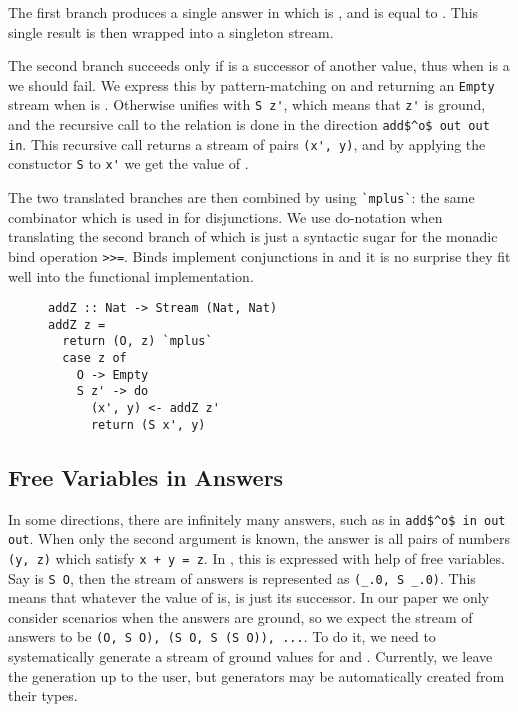 The first \conde branch produces a single answer in which \x is \zero, and \y is equal to \z.
This single result is then wrapped into a singleton stream.

The second \conde branch succeeds only if \z is a successor of another value, thus when \z is a \zero we should fail.
We express this by pattern-matching on \z and returning an \lstinline{Empty} stream when \z is \zero.
Otherwise \z unifies with \lstinline{S z'}, which means that \lstinline{z'} is ground, and the recursive call to the relation is done in the direction \lstinline{add$^o$ out out in}.
This recursive call returns a stream of pairs \lstinline{(x', y)}, and by applying the constuctor \lstinline{S} to \lstinline{x'} we get the value of \x.

The two translated \conde branches are then combined by using \lstinline{`mplus`}: the same combinator which is used in \mk for disjunctions.
We use do-notation when translating the second branch of \conde which is just a syntactic sugar for the monadic bind operation \lstinline{>>=}.
Binds implement conjunctions in \mk and it is no surprise they fit well into the functional implementation.

\begin{figure}[!t]
  \centering
  \begin{minipage}{\columnwidth}
    \begin{lstlisting}[label={add_z}, caption={Function for \lstinline{addo out out in} direction}, captionpos=b, frame=tb]
addZ :: Nat -> Stream (Nat, Nat)
addZ z =
  return (O, z) `mplus`
  case z of
    O -> Empty
    S z' -> do
      (x', y) <- addZ z'
      return (S x', y)
    \end{lstlisting}
  \end{minipage}
\end{figure}

\subsection{Free Variables in Answers}

In some directions, there are infinitely many answers, such as in \lstinline{add$^o$ in out out}.
When only the second argument is known, the answer is all pairs of numbers \lstinline{(y, z)} which satisfy \lstinline{x + y = z}.
In \mk, this is expressed with help of free variables.
Say \x is \lstinline{S O}, then the stream of answers is represented as \lstinline{(_.0, S _.0)}.
This means that whatever the value of \y is, \z is just its successor.
In our paper we only consider scenarios when the answers are ground, so we expect the stream of answers to be \lstinline{(O, S O), (S O, S (S O)), ...}.
To do it, we need to systematically generate a stream of ground values for \y and \z.
Currently, we leave the generation up to the user, but generators may be automatically created from their types.

